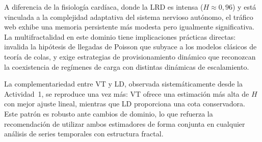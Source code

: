 A diferencia de la fisiología cardíaca, donde la LRD es intensa
($H\approx0{,}96$) y está vinculada a la complejidad adaptativa del sistema
nervioso autónomo, el tráfico web exhibe una memoria persistente más modesta
pero igualmente significativa. La multifractalidad en este dominio tiene
implicaciones prácticas directas: invalida la hipótesis de llegadas de Poisson
que subyace a los modelos clásicos de teoría de colas, y exige estrategias de
provisionamiento dinámico que reconozcan la coexistencia de regímenes de carga
con distintas dinámicas de escalamiento.

La complementariedad entre VT y LD, observada sistemáticamente desde la
Actividad~1, se reproduce una vez más: VT ofrece una estimación más alta de $H$
con mejor ajuste lineal, mientras que LD proporciona una cota conservadora. Este
patrón es robusto ante cambios de dominio, lo que refuerza la recomendación de
utilizar ambos estimadores de forma conjunta en cualquier análisis de series
temporales con estructura fractal.


